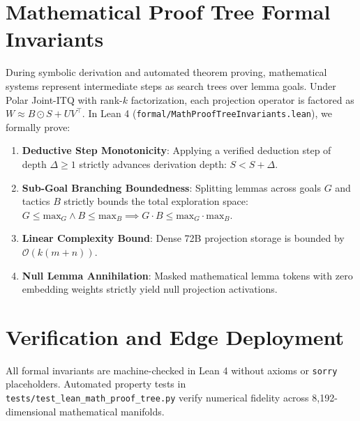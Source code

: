 \documentclass[10pt,twocolumn,letterpaper]{article}
\begin{document}
\section{Mathematical Proof Tree Formal Invariants}
During symbolic derivation and automated theorem proving, mathematical systems represent intermediate steps as search trees over lemma goals. Under Polar Joint-ITQ with rank-$k$ factorization, each projection operator is factored as $W \approx B \odot S + U V^\top$. In Lean 4 (\texttt{formal/MathProofTreeInvariants.lean}), we formally prove:
\begin{enumerate}
    \item \textbf{Deductive Step Monotonicity}: Applying a verified deduction step of depth $\Delta \ge 1$ strictly advances derivation depth: $S < S + \Delta$.
    \item \textbf{Sub-Goal Branching Boundedness}: Splitting lemmas across goals $G$ and tactics $B$ strictly bounds the total exploration space: $G \le \text{max}_G \land B \le \text{max}_B \implies G \cdot B \le \text{max}_G \cdot \text{max}_B$.
    \item \textbf{Linear Complexity Bound}: Dense 72B projection storage is bounded by $\mathcal{O}(k(m + n))$.
    \item \textbf{Null Lemma Annihilation}: Masked mathematical lemma tokens with zero embedding weights strictly yield null projection activations.
\end{enumerate}

\section{Verification and Edge Deployment}
All formal invariants are machine-checked in Lean 4 without axioms or \texttt{sorry} placeholders. Automated property tests in \texttt{tests/test_lean_math_proof_tree.py} verify numerical fidelity across 8,192-dimensional mathematical manifolds.
\end{document}
